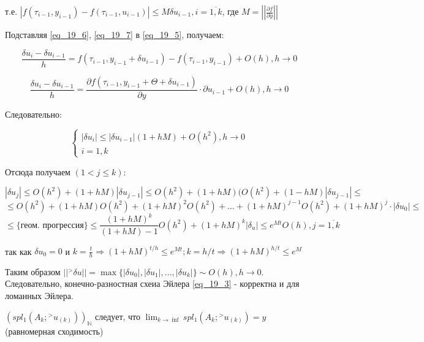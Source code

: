 \documentclass[__main__.tex]{subfiles}
\begin{document}
т.е. $|f(\tau_{i - 1}, y_{i-1}) - f(\tau_{i - 1}, u_{i - 1})| \le M \delta u_{i - 1}, i = \overline{1, k}$, где $M = \left|\left|\frac{\partial f}{\partial y}\right|\right|$

Подставляя \ref{eq_19_6}, \ref{eq_19_7} в \ref{eq_19_5}, получаем:

$$\frac{\delta u_i - \delta u_{i - 1}}{h} = f(\tau_{i - 1}, y_{i - 1} + \delta u_{i - 1}) - f(\tau_{i - 1}, y_{i - 1}) + O(h), h \to 0$$

$$\frac{\delta u_i - \delta u_{i - 1}}{h} = \frac{\partial f(\tau_{i - 1}, y_{i - 1} + \Theta + \delta u_{i - 1})}{\partial y} \cdot \partial u_{i - 1} + O(h), h \to 0$$

Следовательно:

$$
\begin{cases}
|\delta u_i | \le |\delta u_{i - 1}| (1 + hM) + O(h^2), h \to 0\\
i = 1, k
\end{cases}
$$

Отсюда получаем $(1 < j \le k)$:

$$|\delta u_j| \le O(h^2) + (1 + hM) |\delta u_{j - 1}| \le O(h^2) + (1 + hM)(O(h^2) +  (1 - hM)|\delta u_{j - 1}|\le $$
$$\le O(h^2) + (1 + hM) O(h^2) + (1 + hM)^2 O(h^2) + ... + (1 + hM)^{j - 1} O(h^2) + (1 + hM)^j \cdot |\delta u_0| \le $$
$$ \le \{ \text{геом. прогрессия} \} \le \frac{(1 + hM)^k}{(1 + hM) - 1} O(h^2) + (1 + hM)^k |\delta_u| \le e^{Mt} O(h), j = \overline{1, k}$$

так как $\delta u_0 = 0$ и $k = \frac{t}{h} \Rightarrow (1 + hM)^{t/h} \le e^{Mt}; k = h/t \Rightarrow (1 + hM)^{h/t} \le e^M$ 

Таким образом $||{}^{>}\delta u|| = \max \{|\delta u_0|, |\delta u_1|, ..., |\delta u_k|\} \sim O(h), h \to 0$. Следовательно, конечно-разностная схеиа Эйлера \ref{eq_19_3} - корректна и для ломанных Эйлера.

$(spl_1(A_k; {}^{>}u_{(k)}))_{\mathbb{N}}$ следует, что $\lim_{k \to \inf} spl_1(A_k; {}^{>}u_{(k)}) = y$ (равномерная сходимость)
 
\end{document}
